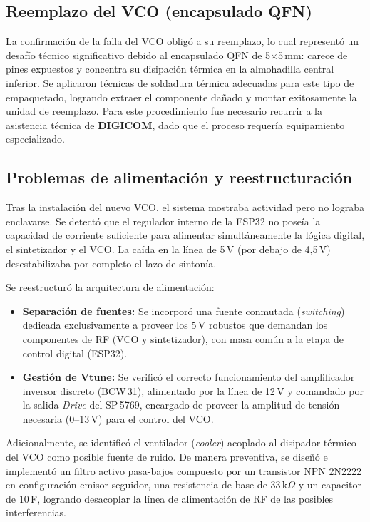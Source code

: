 \documentclass[12pt, a4paper]{article}
\begin{document}
	\subsection{Reemplazo del VCO (encapsulado QFN)}
	
	La confirmación de la falla del VCO obligó a su reemplazo, lo cual representó un desafío técnico
	significativo debido al encapsulado QFN de 5$\times$5\,mm: carece de pines expuestos y concentra su
	disipación térmica en la almohadilla central inferior. Se aplicaron técnicas de soldadura térmica
	adecuadas para este tipo de empaquetado, logrando extraer el componente dañado y montar
	exitosamente la unidad de reemplazo. Para este procedimiento fue necesario recurrir a la asistencia
	técnica de \textbf{DIGICOM}, dado que el proceso requería equipamiento especializado.
	
	\subsection{Problemas de alimentación y reestructuración}
	
	Tras la instalación del nuevo VCO, el sistema mostraba actividad pero no lograba enclavarse. Se
	detectó que el regulador interno de la ESP32 no poseía la capacidad de corriente suficiente para
	alimentar simultáneamente la lógica digital, el sintetizador y el VCO. La caída en la línea de 5\,V
	(por debajo de 4{,}5\,V) desestabilizaba por completo el lazo de sintonía.
	
	Se reestructuró la arquitectura de alimentación:
	
	\begin{itemize}[leftmargin=*]
		\item \textbf{Separación de fuentes:} Se incorporó una fuente conmutada (\textit{switching}) dedicada
		exclusivamente a proveer los 5\,V robustos que demandan los componentes de RF (VCO y
		sintetizador), con masa común a la etapa de control digital (ESP32).
		\item \textbf{Gestión de Vtune:} Se verificó el correcto funcionamiento del amplificador inversor
		discreto (BCW\,31), alimentado por la línea de 12\,V y comandado por la salida \textit{Drive}
		del SP\,5769, encargado de proveer la amplitud de tensión necesaria (0–13\,V) para el control
		del VCO.
	\end{itemize}
	
	Adicionalmente, se identificó el ventilador (\textit{cooler}) acoplado al disipador térmico del VCO
	como posible fuente de ruido. De manera preventiva, se diseñó e implementó un filtro activo pasa-bajos
	compuesto por un transistor NPN 2N2222 en configuración emisor seguidor, una resistencia de base de
	33\,k$\Omega$ y un capacitor de 10\,\textmu F, logrando desacoplar la línea de alimentación de RF
	de las posibles interferencias.
	
\end{document}
